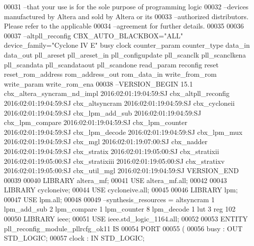 \begin{DoxyCode}
{00031 \textcolor{keyword}{--that your use is for the sole purpose of programming logic }
00032 \textcolor{keyword}{--devices manufactured by Altera and sold by Altera or its }
00033 \textcolor{keyword}{--authorized distributors.  Please refer to the applicable }
00034 \textcolor{keyword}{--agreement for further details.}
00035 
00036 
00037 \textcolor{keyword}{--altpll\_reconfig CBX\_AUTO\_BLACKBOX="ALL" device\_family="Cyclone IV E" busy clock counter\_param
       counter\_type data\_in data\_out pll\_areset pll\_areset\_in pll\_configupdate pll\_scanclk pll\_scanclkena pll\_scandata
       pll\_scandataout pll\_scandone read\_param reconfig reset reset\_rom\_address rom\_address\_out rom\_data\_in write\_from\_rom
       write\_param write\_rom\_ena}
00038 \textcolor{keyword}{--VERSION\_BEGIN 15.1 cbx\_altera\_syncram\_nd\_impl 2016:02:01:19:04:59:SJ cbx\_altpll\_reconfig
       2016:02:01:19:04:59:SJ cbx\_altsyncram 2016:02:01:19:04:59:SJ cbx\_cycloneii 2016:02:01:19:04:59:SJ cbx\_lpm\_add\_sub
       2016:02:01:19:04:59:SJ cbx\_lpm\_compare 2016:02:01:19:04:59:SJ cbx\_lpm\_counter 2016:02:01:19:04:59:SJ cbx\_lpm\_decode
       2016:02:01:19:04:59:SJ cbx\_lpm\_mux 2016:02:01:19:04:59:SJ cbx\_mgl 2016:02:01:19:07:00:SJ cbx\_nadder
       2016:02:01:19:04:59:SJ cbx\_stratix 2016:02:01:19:05:00:SJ cbx\_stratixii 2016:02:01:19:05:00:SJ cbx\_stratixiii
       2016:02:01:19:05:00:SJ cbx\_stratixv 2016:02:01:19:05:00:SJ cbx\_util\_mgl 2016:02:01:19:04:59:SJ  VERSION\_END}
00039 
00040 \textcolor{vhdlkeyword}{ LIBRARY }\textcolor{keywordflow}{altera\_mf};
00041 \textcolor{vhdlkeyword}{ USE }\textcolor{keywordflow}{altera\_mf.all};
00042 
00043 \textcolor{vhdlkeyword}{ LIBRARY }\textcolor{keywordflow}{cycloneive};
00044 \textcolor{vhdlkeyword}{ USE }\textcolor{keywordflow}{cycloneive.all};
00045 
00046 \textcolor{vhdlkeyword}{ LIBRARY }\textcolor{keywordflow}{lpm};
00047 \textcolor{vhdlkeyword}{ USE }\textcolor{keywordflow}{lpm.all};
00048 
00049 \textcolor{keyword}{--synthesis\_resources = altsyncram 1 lpm\_add\_sub 2 lpm\_compare 1 lpm\_counter 8 lpm\_decode 1 lut 3 reg 102 }
00050 \textcolor{vhdlkeyword}{ LIBRARY }\textcolor{keywordflow}{ieee};
00051 \textcolor{vhdlkeyword}{ USE }ieee.std\_logic\_1164.\textcolor{keywordflow}{all};
00052 
00053 \textcolor{keywordflow}{ ENTITY  }pll_reconfig_module_pllrcfg_ok11 \textcolor{keywordflow}{IS} 
00054      \textcolor{keywordflow}{PORT} 
00055      \textcolor{vhdlchar}{(} 
00056          \textcolor{vhdlchar}{busy}   \textcolor{vhdlchar}{:}   \textcolor{keywordflow}{OUT}  \textcolor{comment}{STD\_LOGIC};
00057          \textcolor{vhdlchar}{clock}  \textcolor{vhdlchar}{:}   \textcolor{keywordflow}{IN}  \textcolor{comment}{STD\_LOGIC};
}
\end{DoxyCode}

